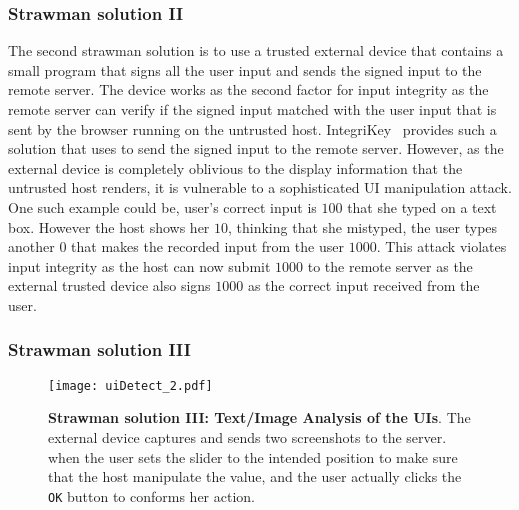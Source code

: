 \subsubsection{\bfseries Strawman solution II}
\label{sec:approach:strawman:2}

The second strawman solution is to use a trusted external device that contains a small program that signs all the user input and sends the signed input to the remote server. The device works as the second factor for input integrity as the remote server can verify if the signed input matched with the user input that is sent by the browser running on the untrusted host. IntegriKey~\cite{IntegriKey} provides such a solution that uses \webusb to send the signed input to the remote server. However, as the external device is completely oblivious to the display information that the untrusted host renders, it is vulnerable to a sophisticated UI manipulation attack. One such example could be, user's correct input is $100$ that she typed on a text box. However the host shows her $10$, thinking that she mistyped, the user types another $0$ that makes the recorded input from the user $1000$. This attack violates input integrity as the host can now submit $1000$ to the remote server as the external trusted device also signs $1000$ as the correct input received from the user.  

\subsubsection{\bfseries Strawman solution III}
\label{sec:approach:strawman:3}

\begin{figure}[t]
\centering
\texttt{[image: uiDetect\_2.pdf]}
\caption{\textbf{Strawman solution III: Text/Image Analysis of the UIs}. The external device captures and sends two screenshots to the server. \one when the user sets the slider to the intended position to make sure that the host manipulate the value, and \two the user actually clicks the \texttt{OK} button to conforms her action.}
\label{fig:uiDetect}
\centering
\end{figure}

